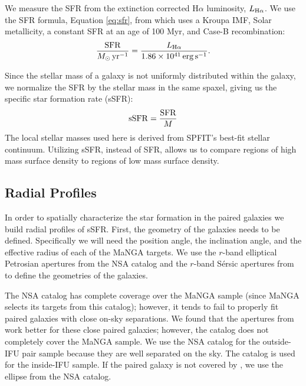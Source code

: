 \documentclass[iop,revtex4,twocolumn,apj,numberedappendix,appendixfloats]{emulateapj}
\begin{document}
We measure the SFR from the extinction corrected H$\alpha$ luminosity, $L_{{\rm H}\alpha}$.  We use the SFR formula, Equation \ref{eq:sfr}, from \citet{Murphy:2011} which uses a Kroupa IMF, Solar metallicity, a constant SFR at an age of 100 Myr, and Case-B recombination: 
\begin{equation}\label{eq:sfr}
\frac{\rm{SFR}}{M_{\odot} \, \rm{yr^{-1}}} = \frac{L_{\rm H\alpha}}{1.86 \times 10^{41}\, \rm{erg\,s}^{-1}}.
\end{equation}

Since the stellar mass of a galaxy is not uniformly distributed within the galaxy, we normalize the SFR by the stellar mass in the same spaxel, giving us the specific star formation rate (sSFR):
\begin{equation}
{\rm sSFR} = \frac{\rm SFR}{M}
\end{equation}
The local stellar masses used here is derived from {\sc SPFIT}'s best-fit stellar continuum. Utilizing sSFR, instead of SFR, allows us to compare regions of high mass surface density to regions of low mass surface density. 

\subsection{Radial Profiles}\label{sec:radial}

In order to spatially characterize the star formation in the paired galaxies we build radial profiles of sSFR. First, the geometry of the galaxies needs to be defined. Specifically we will need the position angle, the inclination angle, and the effective radius of each of the MaNGA targets. We use the $r$-band elliptical Petrosian apertures from the NSA catalog and the $r$-band S\'ersic apertures from \citet{Simard:2011} to define the geometries of the galaxies. 

The NSA catalog has complete coverage over the MaNGA sample (since MaNGA selects its targets from this catalog); however, it tends to fail to properly fit paired galaxies with close on-sky separations. We found that the apertures from \citet{Simard:2011} work better for these close paired galaxies; however, the catalog does not completely cover the MaNGA sample. We use the NSA catalog for the outside-IFU pair sample because they are well separated on the sky. The \citet{Simard:2011} catalog is used for the inside-IFU sample. If the paired galaxy is not covered by \citet{Simard:2011}, we use the ellipse from the NSA catalog. 
\end{document}

